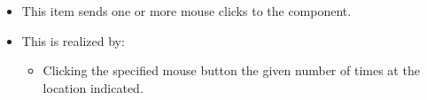 \begin{itemize}
\item This item sends one or more mouse clicks to the component.
\item This is realized by:
\begin{itemize}
\item Clicking the specified mouse button the given number of times at the location indicated.
\end{itemize}
\end{itemize}
